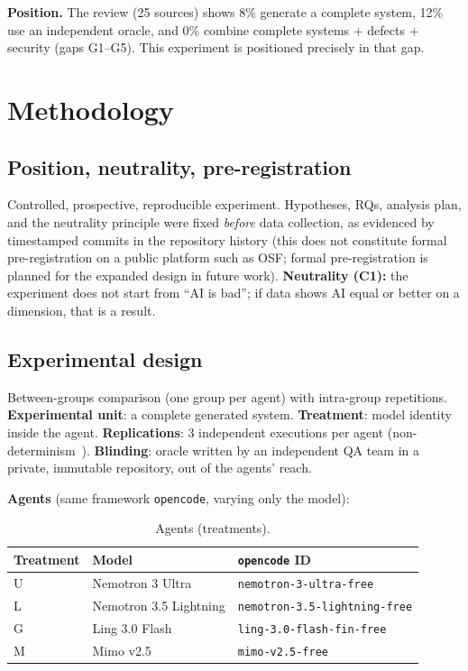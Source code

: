 \documentclass[sigconf,anonymous]{acmart}
\begin{document}
\textbf{Position.} The review (25 sources) shows 8\% generate a complete system, 12\% use an independent oracle, and 0\% combine complete systems $+$ defects $+$ security (gaps G1--G5). This experiment is positioned precisely in that gap.

\section{Methodology}
\subsection{Position, neutrality, pre-registration}
Controlled, prospective, reproducible experiment. Hypotheses, RQs, analysis plan, and the neutrality principle were fixed \emph{before} data collection, as evidenced by timestamped commits in the repository history (this does not constitute formal pre-registration on a public platform such as OSF; formal pre-registration is planned for the expanded design in future work). \textbf{Neutrality (C1):} the experiment does not start from ``AI is bad''; if data shows AI equal or better on a dimension, that is a result.

\subsection{Experimental design}
Between-groups comparison (one group per agent) with intra-group repetitions. \textbf{Experimental unit}: a complete generated system. \textbf{Treatment}: model identity inside the agent. \textbf{Replications}: 3 independent executions per agent (non-determinism~\cite{B04}). \textbf{Blinding}: oracle written by an independent QA team in a private, immutable repository, out of the agents' reach.

\textbf{Agents} (same framework \texttt{opencode}, varying only the model):

\begin{table}[t]
\caption{Agents (treatments).}
\label{tab:agents}
\small
\begin{tabular}{lll}
\toprule
\textbf{Treatment} & \textbf{Model} & \textbf{\texttt{opencode} ID}\\
\midrule
U & Nemotron 3 Ultra & \texttt{nemotron-3-ultra-free}\\
L & Nemotron 3.5 Lightning & \texttt{nemotron-3.5-lightning-free}\\
G & Ling 3.0 Flash & \texttt{ling-3.0-flash-fin-free}\\
M & Mimo v2.5 & \texttt{mimo-v2.5-free}\\
\bottomrule
\end{tabular}
\end{table}
\end{document}
